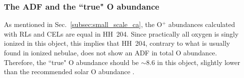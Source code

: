 \documentclass[twocolumn]{aastex63}
\newcommand{\cesar}[1]{{\color{red}C: #1}}
\begin{document}
\subsubsection{The ADF and the ``true" O abundance}
\label{subsubsec:ADF_and_O}

As mentioned in Sec.~\ref{subsec:small_scale_ca}, the O$^+$ abundances calculated with RLs and CELs are equal in HH~204. 
Since practically all oxygen is singly ionized in this object, this implies that HH~204, contrary to what is usually found in ionized nebulae, does not show an ADF in total O abundance. Therefore, the ``true" O abundance  should be $\sim 8.6$ in this object, slightly lower  than the recommended solar O abundance \citep[$8.73 \pm 0.07$,][]{lodders19}.


\end{document}
